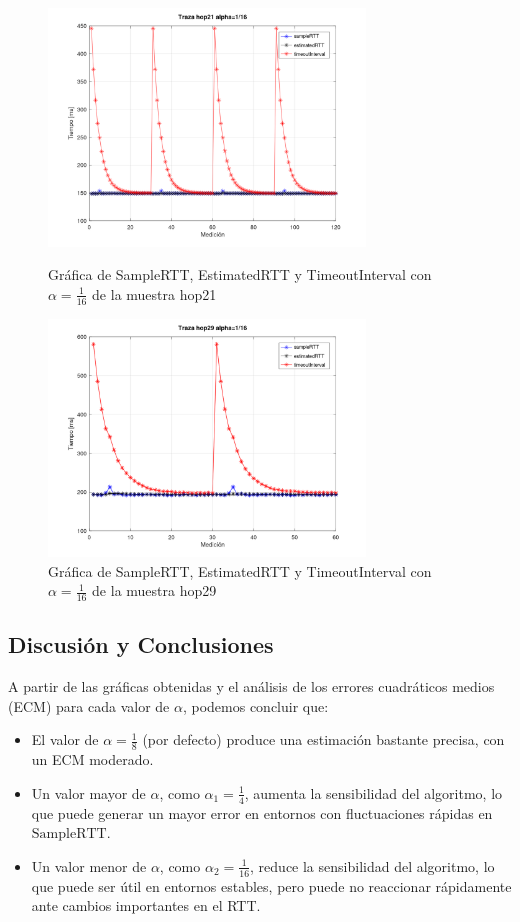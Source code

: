 \begin{figure}[H]
  \centering
  \includegraphics[width=0.75\textwidth]{img/alpha116/trazaHop21.png} 
  \caption{Gráfica de SampleRTT, EstimatedRTT y TimeoutInterval con \( \alpha = \frac{1}{16} \)
  de la muestra hop21}

  \includegraphics[width=0.75\textwidth]{img/alpha116/trazaHop29.png} 
  \caption{Gráfica de SampleRTT, EstimatedRTT y TimeoutInterval con \( \alpha = \frac{1}{16} \)
  de la muestra hop29}
  \label{fig:alpha2_p2}
\end{figure}

\subsection*{Discusión y Conclusiones}
\noindent A partir de las gráficas obtenidas y el análisis de los errores cuadráticos medios (ECM) 
para cada valor de \( \alpha \), podemos concluir que:

\begin{itemize}
    \item El valor de \( \alpha = \frac{1}{8} \) (por defecto) produce una estimación bastante precisa,
    con un ECM moderado.
    \item Un valor mayor de \( \alpha \), como \( \alpha_1 = \frac{1}{4} \), aumenta la sensibilidad
    del algoritmo, lo que puede generar un mayor error en entornos con fluctuaciones rápidas en
    \( \text{SampleRTT} \).
    \item Un valor menor de \( \alpha \), como \( \alpha_2 = \frac{1}{16} \), reduce la sensibilidad
    del algoritmo, lo que puede ser útil en entornos estables, pero puede no reaccionar rápidamente 
    ante cambios importantes en el RTT.
\end{itemize}


